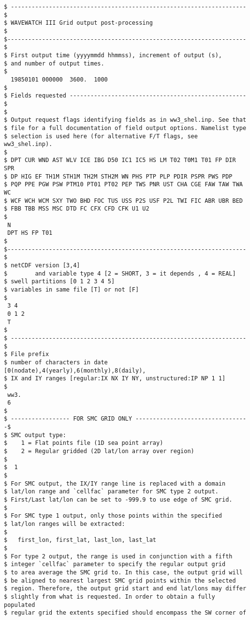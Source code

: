 \begin{footnotesize}
\begin{verbatim}
$ -------------------------------------------------------------------- $
$ WAVEWATCH III Grid output post-processing                            $
$--------------------------------------------------------------------- $
$ First output time (yyyymmdd hhmmss), increment of output (s), 
$ and number of output times.
$
  19850101 000000  3600.  1000
$
$ Fields requested --------------------------------------------------- $
$
$ Output request flags identifying fields as in ww3_shel.inp. See that
$ file for a full documentation of field output options. Namelist type
$ selection is used here (for alternative F/T flags, see ww3_shel.inp).
$
$ DPT CUR WND AST WLV ICE IBG D50 IC1 IC5 HS LM T02 T0M1 T01 FP DIR SPR
$ DP HIG EF TH1M STH1M TH2M STH2M WN PHS PTP PLP PDIR PSPR PWS PDP
$ PQP PPE PGW PSW PTM10 PT01 PT02 PEP TWS PNR UST CHA CGE FAW TAW TWA WC
$ WCF WCH WCM SXY TWO BHD FOC TUS USS P2S USF P2L TWI FIC ABR UBR BED
$ FBB TBB MSS MSC DTD FC CFX CFD CFK U1 U2 
$
 N
 DPT HS FP T01
$
$--------------------------------------------------------------------- $
$ netCDF version [3,4]
$        and variable type 4 [2 = SHORT, 3 = it depends , 4 = REAL]
$ swell partitions [0 1 2 3 4 5]
$ variables in same file [T] or not [F] 
$
 3 4
 0 1 2
 T
$
$ -------------------------------------------------------------------- $
$ File prefix
$ number of characters in date [0(nodate),4(yearly),6(monthly),8(daily),
$ IX and IY ranges [regular:IX NX IY NY, unstructured:IP NP 1 1]
$
 ww3.         
 6
$
$ ----------------- FOR SMC GRID ONLY ---------------------------------$
$ SMC output type:
$    1 = Flat points file (1D sea point array)
$    2 = Regular gridded (2D lat/lon array over region)
$
$  1
$
$ For SMC output, the IX/IY range line is replaced with a domain
$ lat/lon range and `cellfac` parameter for SMC type 2 output.
$ First/Last lat/lon can be set to -999.9 to use edge of SMC grid.
$
$ For SMC type 1 output, only those points within the specified 
$ lat/lon ranges will be extracted:
$
$   first_lon, first_lat, last_lon, last_lat
$
$ For type 2 output, the range is used in conjunction with a fifth
$ integer `cellfac` parameter to specify the regular output grid
$ to area average the SMC grid to. In this case, the output grid will
$ be aligned to nearest largest SMC grid points within the selected 
$ region. Therefore, the output grid start and end lat/lons may differ 
$ slightly from what is requested. In order to obtain a fully populated
$ regular grid the extents specified should encompass the SW corner of

\end{verbatim}
\end{footnotesize}
